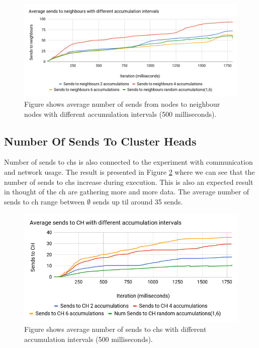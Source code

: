 \documentclass[USenglish]{uit-thesis}
\begin{document}
\begin{figure} [ht]
\centering
\includegraphics[width=\textwidth]{sendsChart.png}
\caption{Figure shows average number of sends from nodes to neighbour nodes with different accumulation intervals (500 milliseconds).}
\label{fig:sendsChart}
\end{figure}


\newpage

\subsection{Number Of Sends To Cluster Heads}
Number of sends to \gls{ch}s is also connected to the experiment  with communication and network usage. The result is presented in Figure \ref{fig:sendschChart} where we can see that the number of sends to \gls{ch}s increase during execution. This is also an expected result in thought of the \gls{ch} are gathering more and more data. The average number of sends to \gls{ch} range between $\emptyset$ sends up til around 35 sends.



\begin{figure} [ht]
\centering
\includegraphics[width=\textwidth]{sendschChart.png}
\caption{Figure shows average number of sends to \gls{ch}s with different accumulation intervals (500 milliseconds).}
\label{fig:sendschChart}
\end{figure}
\end{document}
